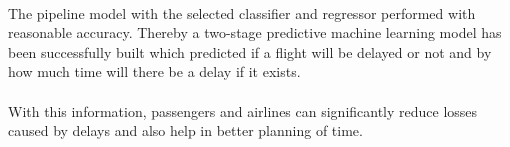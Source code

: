 \documentclass[12pt,letter-paper]{article}
\begin{document}
    \paragraph{}
    The pipeline model with the selected classifier and regressor performed with reasonable accuracy. Thereby a two-stage predictive machine learning model has been successfully built which predicted if a flight will be delayed or not and by how much time will there be a delay if it exists. 
    
    \paragraph{}
    With this information, passengers and airlines can significantly reduce losses caused by delays and also help in better planning of time. 

    
\end{document}
